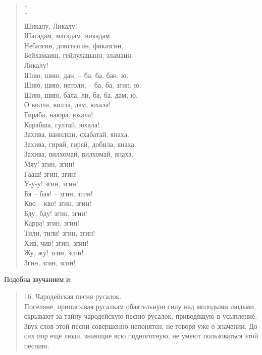 \settowidth{\versewidth}{Шию, шию, нетоли, – ба, ба, згин, ю.} 
\begin{verse}[\versewidth]

Шикалу, Ликалу!\\
Шагадам, магадам, викадам.\\
Небазгин, доюлазгин, фиказгин,\\
Бейхамаиш, гейлулашанн, эламаин.\\
Ликалу!\\
Шию, шию, дан, – ба, ба, бан, ю.\\
Шию, шию, нетоли, – ба, ба, згин, ю.\\
Шию, шию, бала, ли, ба, ба, дам, ю.\\
О вилла, вилла, дам, юхала!\\
Гираба, наюра, юхала!\\
Карабша, гултай, юхала!\\
Захива, ванилши, схабатай, янаха.\\
Захива, гиряй, гиряй, добила, янаха.\\
Захива, вилхомай, вилхомай, янаха.\\
Мяу! згин, згин!\\
Гааш! згин, згин!\\
У-у-у! згин, згин!\\
Бя – бая! – згин, згин!\\
Кво – кво! згин, згин!\\
Бду, бду! згин, згин!\\
Карра! згин, згин!\\
Тили, тили! згин, згин!\\
Хив, чив! згин, згин!\\
Жу, жу! згин, згин!\\
Згин, згин, згин!
\end{verse}

Подобна звучанием и: 

\begin{quotation}
16. Чародейская песня русалок.\\
 
Поселяне, приписывая русалкам обаятельную силу над молодыми людьми, скрывают за тайну чародейскую песню русалок, приводящую в усыпление. Звук слов этой песни совершенно непонятен, не говоря уже о значении. До сих пор еще люди, знающие всю подноготную, не умеют пользоваться этой песнию.
\end{quotation}

